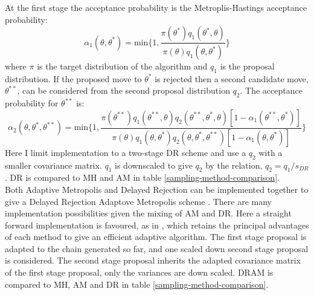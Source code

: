 At the first stage the acceptance probability is the Metroplis-Hastings acceptance probability:
\begin{equation}
	\alpha_1(\theta,\theta^*) = \text{min}\bigg\{1,\frac{\pi(\theta^*)q_1(\theta^*,\theta)}{\pi(\theta)q_1(\theta,\theta^*)} \bigg\}
\end{equation}
where $\pi$ is the target distribution of the algorithm and $q_1$ is the proposal distribution. If the proposed move to $\theta^*$ is rejected then a second candidate move, $\theta^{**}$, can be considered from the second proposal distribution $q_2$. The acceptance probability for $\theta^{**}$ is:
\begin{equation}
	\alpha_2(\theta,\theta^*,\theta^{**}) = \text{min}\bigg\{1,\frac{\pi(\theta^{**})q_1(\theta^{**},\theta)q_2(\theta^{**},\theta^*,\theta)[1-\alpha_1(\theta^{**},\theta^*)]}{\pi(\theta)q_1(\theta,\theta^*)q_2(\theta,\theta^*,\theta^{**})[1-\alpha_1(\theta,\theta^*)]} \bigg\}
\end{equation}
Here I limit implementation to a two-stage DR scheme and use a $q_2$ with a smaller covariance matrix. $q_1$ is downscaled to give $q_2$ by the relation, $q_2 = q_1/s_{DR}$. DR is compared to MH and AM in table \ref{sampling-method-comparison}.\\

Both Adaptive Metropolis and Delayed Rejection can be implemented together to give a Delayed Rejection Adaptove Metropolis scheme \citep{Laine2008}. There are many implementation possibilities given the mixing of AM and DR. Here a straight forward implementation is favoured, as in \citet{Laine2008}, which retains the principal advantages of each method to give an efficient adaptive algorithm.    The first stage proposal is adapted to the chain generated so far, and one scaled down second stage proposal is considered. The second stage proposal inherits the adapted covariance matrix of the first stage proposal, only the variances are down scaled. DRAM is compared to MH, AM and DR in table \ref{sampling-method-comparison}.\\

